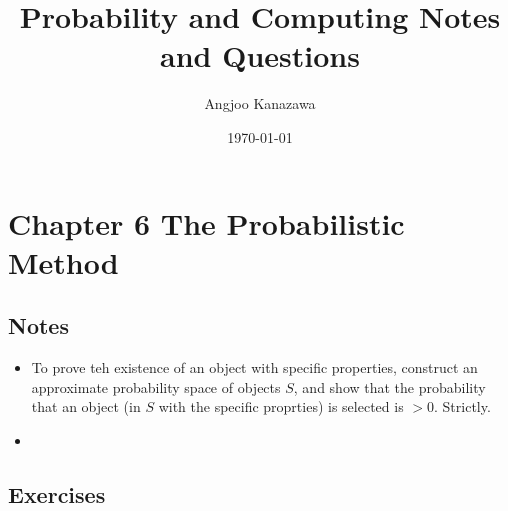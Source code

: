 \documentclass[10pt]{article}
\title{Probability and Computing Notes and Questions}
\author{Angjoo Kanazawa}
\date{\today}
\begin{document}
\maketitle \thispagestyle{empty}

\section{Chapter 6 The Probabilistic Method}
\label{sec:chap6}


\subsection{Notes}
\begin{itemize}
\item To prove teh existence of an object with specific properties,
  construct an approximate probability space of objects $\mathit{S}$,
  and show that the probability that an object (in $\mathit{S}$ with
  the specific proprties) is selected is $> 0$. Strictly.
\item 
\end{itemize}

\subsection{Exercises}
\end{document}
